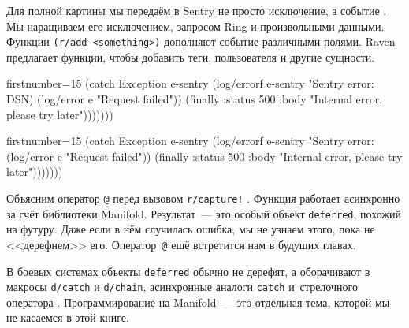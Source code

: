 \fi

\wavebottom

Для полной картины мы передаём в Sentry не просто исключение, а событие
. Мы наращиваем его исключением, запросом Ring и произвольными
данными. Функции \verb|(r/add-<something>)| дополняют событие различными
полями. Raven предлагает функции, чтобы добавить теги, пользователя и другие
сущности.

\wavetop

\ifx\devicetype\mobile

\begin{english}
  \begin{clojure/lines*}{firstnumber=15}
            (catch Exception e-sentry
              (log/errorf e-sentry
                "Sentry error: %
                DSN)
              (log/error e
                "Request failed"))
            (finally
              {:status 500
               :body
                "Internal error,
                please try
                later"})))))))
  \end{clojure/lines*}
\end{english}

\else

\begin{english}
  \begin{clojure/lines*}{firstnumber=15}
            (catch Exception e-sentry
              (log/errorf e-sentry "Sentry error: %
              (log/error e "Request failed"))
            (finally
              {:status 500
               :body "Internal error, please try later"})))))))
  \end{clojure/lines*}
\end{english}

\fi


Объясним оператор \verb|@| перед вызовом \verb|r/capture!| . Функция
работает асинхронно за счёт библиотеки Manifold. Результат~--- это особый
объект \verb|deferred|, похожий на футуру. Даже если в нём случилась ошибка, мы
не узнаем этого, пока не <<дерефнем>> его. Оператор~\verb|@| ещё встретится нам
в будущих главах.

В боевых системах объекты \verb|deferred| обычно не дерефят, а оборачивают в
макросы \verb|d/catch| и \verb|d/chain|, асинхронные аналоги \verb|catch|
и~стрелочного оператора \arr{}. Программирование на Manifold~--- это
отдельная тема, которой мы не касаемся в этой книге.

